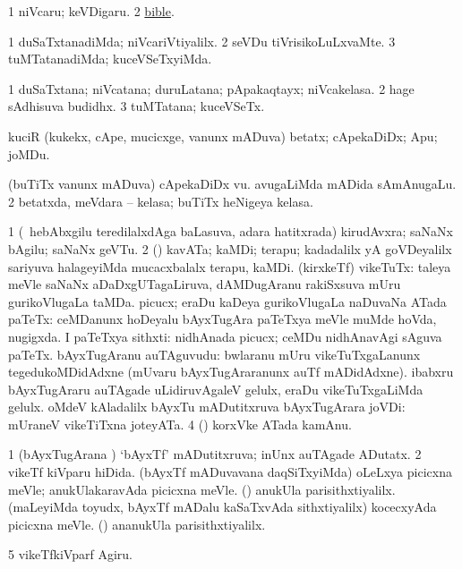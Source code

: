 \noindent
\gl{\pagu}
\bmng
\bnum
\num{1}  niVcaru; keVDigaru. 
\num{2}  \hyperref{kandict_b.pdf}{B}{bible(3)}{bible}.
\enum
\emng
\eentry

\bentry
{}
\gl{\kirxvi}
\bmng
\bnum
\num{1} duSaTxtanadiMda; niVcariVtiyalilx. 
\num{2} seVDu tiVrisikoLuLxvaMte. 
\num{3} tuMTatanadiMda; kuceVSeTxyiMda. 
\enum
\emng
\eentry

\bentry
{}
\gl{\nA}
\bmng
\bnum
\num{1} duSaTxtana; niVcatana; duruLatana; pApakaqtayx; niVcakelasa. 
\num{2} hage sAdhisuva budidhx. 
\num{3} tuMTatana; kuceVSeTx. 
\enum
\emng
\eentry

\bentry
{}
\gl{\nA}
\bmng
kuciR (kukekx, cApe, mucicxge, \mo vanunx mADuva) betatx; cApekaDiDx; Apu; joMDu. 
\emng
\eentry

\bentry
{}
\gl{\nA}
\bmng
\bnum
{} 
\banum
{} (buTiTx \mo vanunx mADuva) cApekaDiDx \mo vu. 
 avugaLiMda mADida sAmAnugaLu. 
\eanum
\numie
\num{2} betatxda, meVdara -- kelasa; buTiTx heNigeya kelasa. 
\enum
\emng
\eentry

\bentry
{} 
\gl{\nA}
\expl{}
\bmng
\bnum
\num{1} (\kanmu\ hebAbxgilu teredilalxdAga baLasuva, adara hatitxrada) kirudAvxra; saNaNx bAgilu; saNaNx geVTu. 
\num{2} (\ame) kavATa; kaMDi; terapu; kadadalilx yA goVDeyalilx sariyuva halageyiMda mucacxbalalx terapu, kaMDi. 
 (kirxkeTf) vikeTuTx: 
\banum
{} taleya meVle saNaNx aDaDxgUTagaLiruva, dAMDugAranu rakiSxsuva mUru gurikoVlugaLa taMDa. 
 picucx; eraDu kaDeya gurikoVlugaLa naDuvaNa ATada paTeTx:  ceMDanunx hoDeyalu bAyxTugAra paTeTxya meVle muMde hoVda, nugigxda. 
 I paTeTxya sithxti:  nidhAnada picucx; ceMDu nidhAnavAgi sAguva paTeTx. 
 bAyxTugAranu auTAguvudu:  bwlaranu mUru vikeTuTxgaLanunx tegedukoMDidAdxne (mUvaru bAyxTugAraranunx auTf mADidAdxne).  ibabxru bAyxTugAraru auTAgade uLidiruvAgaleV gelulx, eraDu vikeTuTxgaLiMda gelulx. 
 oMdeV kAladalilx bAyxTu mADutitxruva bAyxTugArara joVDi:  mUraneV vikeTiTxna joteyATa. 
\eanum
\numie
\num{4} (\ame) korxVke  ATada kamAnu. 
\enum
\emng

\noindent
\gl{\pagu}
\bmng
\bnum
\num{1}  (bAyxTugArana \vi) `bAyxTf' mADutitxruva; inUnx auTAgade ADutatx. 
\num{2}  vikeTf kiVparu hiDida. 
  
\banum
{} (bAyxTf mADuvavana daqSiTxyiMda) oLeLxya picicxna meVle; anukUlakaravAda picicxna meVle. 
 (\AmA) anukUla parisithxtiyalilx. 
\eanum
\numie
{}  
\banum
{} (maLeyiMda toyudx, bAyxTf mADalu kaSaTxvAda sithxtiyalilx) kocecxyAda picicxna meVle. 
 (\AmA) ananukUla parisithxtiyalilx. 
\eanum
\numie
\num{5}  vikeTfkiVparf Agiru. 
\enum
\emng
\eentry

